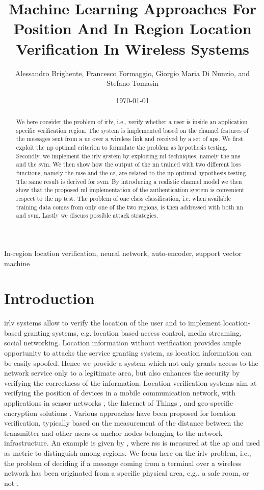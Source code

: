 \documentclass[draftcls,onecolumn,12pt]{IEEEtran}
\title{Machine Learning Approaches For Position And In Region Location Verification In Wireless Systems}
\author{\small Alessandro Brighente, Francesco Formaggio, Giorgio Maria Di Nunzio, and  Stefano Tomasin }
\date{\today}
\begin{document}
\maketitle

\sloppy

\begin{abstract}
We here consider the problem of \ac{irlv}, i.e., verify whether a user is inside an application specific verification region. The system is implemented based on the channel features of the messages sent from a \ac{ue} over a wireless link and received by a set of \acp{ap}. We first exploit the \ac{np} optimal criterion to formulate the problem as hypothesis testing. Secondly, we implement the \ac{irlv} system by exploiting  \ac{ml} techniques, namely the \acp{nn} and the \ac{svm}. We then show how the output of the \ac{nn} trained with two different loss functions, namely the \ac{mse} and the \ac{ce}, are related to the \ac{np} optimal hypothesis testing. The same result is derived for \ac{svm}. By introducing a realistic channel model we then show that the proposed \ac{ml} implementation of the authentication system is convenient respect to the \ac{np} test. The problem of one class classification, i.e. when available training data comes from only one of the two regions, is then addressed with both \ac{nn} and \ac{svm}. Lastly we discuss possible attack strategies.
\end{abstract}

\begin{IEEEkeywords}
In-region location verification, neural network, auto-encoder, support vector machine
\end{IEEEkeywords}

\glsresetall
\clearpage
\section{Introduction}
\Ac{irlv} systems allow to verify the location of the user and to implement location-based granting systems, e.g. location based access control, media streaming, social networking. Location information without verification provides ample opportunity to attacks the service granting system, as location information can be easily spoofed. Hence we provide a system which not only grants access to the network service only to a legitimate area, but also enhances the security by verifying the correctness of the information. Location verification systems aim at verifying the position of devices in a mobile communication network, with applications in sensor networks \cite{Zeng-survey, 8376254, wei2013}, the Internet of Things \cite{7903611}, and geo-specific encryption solutions \cite{quaglia}. Various approaches have been proposed for location verification, typically based on the measurement of the distance between the transmitter and other users or anchor nodes belonging to the network infrastructure. An example is given by \cite{yan2016location}, where \ac{rss} is measured at the \ac{ap} and used as metric to distinguish among regions. We focus here on the \ac{irlv} problem, i.e., the problem of deciding if a message coming from a terminal over a wireless network has been originated from a specific physical area, e.g., a safe room, or not \cite{Zeng-survey}.
\end{document}
